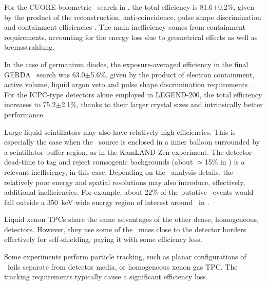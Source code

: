 For the CUORE bolometric \bbonu\ search in , the total efficiency is 81.6$\pm$0.2\%, given by the product of the reconstruction, anti-coincidence, pulse shape discrimination and containment efficiencies \cite{CUORE:2021mvw}. The main inefficiency comes from containment requirements, accounting for the energy loss due to geometrical effects as well as bremsstrahlung.

In the case of germanium diodes, the exposure-averaged efficiency in the final GERDA \bbonu\ search was 63.0$\pm$5.6\%, given by the product of electron containment, active volume, liquid argon veto and pulse shape discrimination requirements \cite{GERDA:2020xhi}. For the ICPC-type detectors alone employed in LEGEND-200, the total efficiency increases to 75.2$\pm$2.1\%, thanks to their larger crystal sizes and intrinsically better performance.

Large liquid scintillators may also have relatively high efficiencies. This is especially the case when the \bb\ source is enclosed in a inner balloon surrounded by a scintillator buffer region, as in the KamLAND-Zen experiment. The detector dead-time to tag and reject comsogenic backgrounds (about $\simeq$15\% in \cite{KamLAND-Zen:2022tow}) is a relevant inefficiency, in this case. Depending on the \bbonu\ analysis details, the relatively poor energy and spatial resolutions may also introduce, effectively, additional inefficiencies. For example, about 22\% of the putative \bbonu\ events would fall outside a 350~keV wide energy region of interest around \Qbb\ in \cite{KamLAND-Zen:2022tow}.

Liquid xenon TPCs share the same advantages of the other dense, homogeneous, detectors. However, they use some of the \bb\ mass close to the detector borders effectively for self-shielding, paying it with some efficiency loss.

Some experiments perform particle tracking, such as planar configurations of \bb\ foils separate from detector media, or homogeneous xenon gas TPC. The tracking requirements typically cause a significant efficiency loss. 


